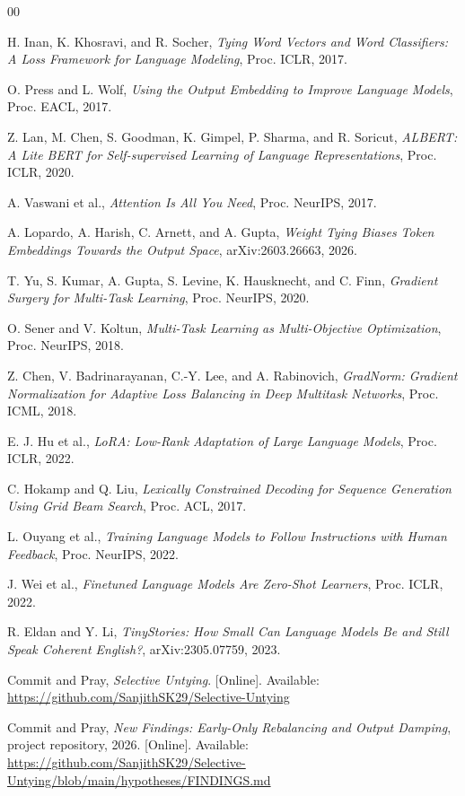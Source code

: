 \documentclass[conference]{IEEEtran}
\begin{document}
\begin{thebibliography}{00}

H. Inan, K. Khosravi, and R. Socher, \emph{Tying Word Vectors and Word
Classifiers: A Loss Framework for Language Modeling}, Proc. ICLR, 2017.

O. Press and L. Wolf, \emph{Using the Output Embedding to Improve Language
Models}, Proc. EACL, 2017.

Z. Lan, M. Chen, S. Goodman, K. Gimpel, P. Sharma, and R. Soricut,
\emph{ALBERT: A Lite BERT for Self-supervised Learning of Language
Representations}, Proc. ICLR, 2020.

A. Vaswani et al., \emph{Attention Is All You Need}, Proc. NeurIPS, 2017.

A. Lopardo, A. Harish, C. Arnett, and A. Gupta, \emph{Weight Tying Biases Token
Embeddings Towards the Output Space}, arXiv:2603.26663, 2026.

T. Yu, S. Kumar, A. Gupta, S. Levine, K. Hausknecht, and C. Finn,
\emph{Gradient Surgery for Multi-Task Learning}, Proc. NeurIPS, 2020.

O. Sener and V. Koltun, \emph{Multi-Task Learning as Multi-Objective
Optimization}, Proc. NeurIPS, 2018.

Z. Chen, V. Badrinarayanan, C.-Y. Lee, and A. Rabinovich, \emph{GradNorm:
Gradient Normalization for Adaptive Loss Balancing in Deep Multitask Networks},
Proc. ICML, 2018.

E. J. Hu et al., \emph{LoRA: Low-Rank Adaptation of Large Language Models},
Proc. ICLR, 2022.

C. Hokamp and Q. Liu, \emph{Lexically Constrained Decoding for Sequence
Generation Using Grid Beam Search}, Proc. ACL, 2017.

L. Ouyang et al., \emph{Training Language Models to Follow Instructions with
Human Feedback}, Proc. NeurIPS, 2022.

J. Wei et al., \emph{Finetuned Language Models Are Zero-Shot Learners},
Proc. ICLR, 2022.

R. Eldan and Y. Li, \emph{TinyStories: How Small Can Language Models Be and
Still Speak Coherent English?}, arXiv:2305.07759, 2023.

Commit and Pray, \emph{Selective Untying}. [Online]. Available:
\url{https://github.com/SanjithSK29/Selective-Untying}

Commit and Pray, \emph{New Findings: Early-Only Rebalancing and Output Damping},
project repository, 2026. [Online]. Available:
\url{https://github.com/SanjithSK29/Selective-Untying/blob/main/hypotheses/FINDINGS.md}

\end{thebibliography}
\end{document}
